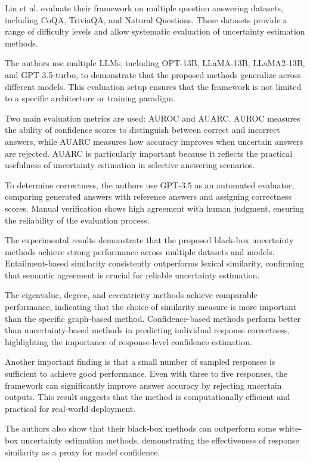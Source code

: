 Lin et al. evaluate their framework on multiple question answering datasets, including CoQA, TriviaQA, and Natural Questions. These datasets provide a range of difficulty levels and allow systematic evaluation of uncertainty estimation methods.

The authors use multiple LLMs, including OPT-13B, LLaMA-13B, LLaMA2-13B, and GPT-3.5-turbo, to demonstrate that the proposed methods generalize across different models. This evaluation setup ensures that the framework is not limited to a specific architecture or training paradigm.

Two main evaluation metrics are used: AUROC and AUARC. AUROC measures the ability of confidence scores to distinguish between correct and incorrect answers, while AUARC measures how accuracy improves when uncertain answers are rejected. AUARC is particularly important because it reflects the practical usefulness of uncertainty estimation in selective answering scenarios.

To determine correctness, the authors use GPT-3.5 as an automated evaluator, comparing generated answers with reference answers and assigning correctness scores. Manual verification shows high agreement with human judgment, ensuring the reliability of the evaluation process.


The experimental results demonstrate that the proposed black-box uncertainty methods achieve strong performance across multiple datasets and models. Entailment-based similarity consistently outperforms lexical similarity, confirming that semantic agreement is crucial for reliable uncertainty estimation.

The eigenvalue, degree, and eccentricity methods achieve comparable performance, indicating that the choice of similarity measure is more important than the specific graph-based method. Confidence-based methods perform better than uncertainty-based methods in predicting individual response correctness, highlighting the importance of response-level confidence estimation.

Another important finding is that a small number of sampled responses is sufficient to achieve good performance. Even with three to five responses, the framework can significantly improve answer accuracy by rejecting uncertain outputs. This result suggests that the method is computationally efficient and practical for real-world deployment.

The authors also show that their black-box methods can outperform some white-box uncertainty estimation methods, demonstrating the effectiveness of response similarity as a proxy for model confidence.


